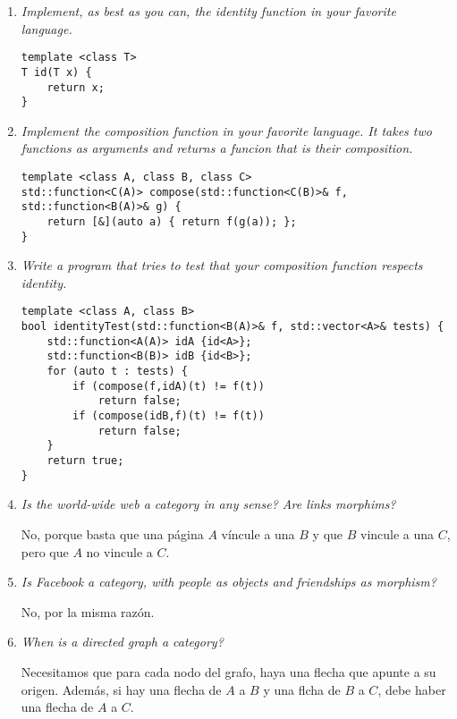 \documentclass[11pt]{article}
\begin{document}
\begin{enumerate}
\item \textit{Implement, as best as you can, the identity function in your favorite language.}

\begin{lstlisting}
template <class T>
T id(T x) {
	return x;
}
\end{lstlisting}

\item \textit{Implement the composition function in your favorite language. It takes two functions as arguments and returns a funcion that is their composition.}

\begin{lstlisting}
template <class A, class B, class C>
std::function<C(A)> compose(std::function<C(B)>& f, std::function<B(A)>& g) {
	return [&](auto a) { return f(g(a)); };
}
\end{lstlisting}

\item \textit{Write a program that tries to test that your composition function respects identity.}
\begin{lstlisting}
template <class A, class B>
bool identityTest(std::function<B(A)>& f, std::vector<A>& tests) {
	std::function<A(A)> idA {id<A>};
	std::function<B(B)> idB {id<B>};
	for (auto t : tests) {
		if (compose(f,idA)(t) != f(t))
			return false;
		if (compose(idB,f)(t) != f(t))
			return false;
	}
	return true;
}
\end{lstlisting}

\item \textit{Is the world-wide web a category in any sense? Are links morphims?}

No, porque basta que una página $A$ víncule a una $B$ y que $B$ vincule a una $C$, pero que $A$ no vincule a $C$.

\item \textit{Is Facebook a category, with people as objects and friendships as morphism?}

No, por la misma razón.

\item \textit{When is a directed graph a category?}

Necesitamos que para cada nodo del grafo, haya una flecha que apunte a su origen. Además, si hay una flecha de $A$ a $B$ y una flcha de $B$ a $C$, debe haber una flecha de $A$ a $C$.
\end{enumerate}
\end{document}
